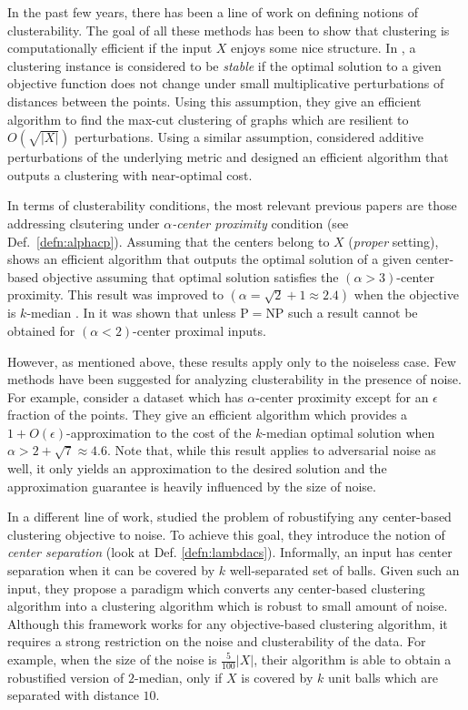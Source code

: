 \documentclass[12pt]{article}
\begin{document}
In the past few years, there has been a line of work on defining notions of clusterability. The goal of all these methods has been to show that clustering is computationally efficient if the input $X$ enjoys some nice structure. In \cite{bilu2012stable}, a clustering instance is considered to be \emph{stable} if the optimal solution to a given objective function does not change under small multiplicative perturbations of distances between the points. Using this assumption, they give an efficient algorithm to find the max-cut clustering of graphs which are resilient to $O(\sqrt{|X|})$ perturbations. Using a similar assumption, \cite{ackerman2009clusterability} considered additive perturbations of the underlying metric and designed an efficient algorithm that outputs a clustering with near-optimal cost. 

In terms of clusterability conditions, the most relevant previous papers are those addressing clsutering under {\em $\alpha$-center proximity} condition (see Def.~\ref{defn:alphacp}).
Assuming that the centers belong to $X$ ({\em proper} setting),  \cite{awasthi2012center} shows an efficient algorithm that outputs the optimal solution of a given center-based objective assuming that optimal solution satisfies the $(\alpha > 3)$-center proximity. This result was improved to $(\alpha = \sqrt{2} + 1 \approx 2.4)$ when the objective is $k$-median \cite{balcan2012clustering}. In \cite{ben2014data} it was shown that unless P$=$NP such a result cannot be obtained for $(\alpha <2)$-center proximal inputs.

However, as mentioned above, these results apply only to the noiseless case. Few methods have been suggested for analyzing clusterability in the presence of noise. For example, \cite{balcan2012clustering} consider a dataset which has $\alpha$-center proximity except for an $\epsilon$ fraction of the points. They give an efficient algorithm which provides a $1+O(\epsilon)$-approximation to the cost of the $k$-median optimal solution when $\alpha > 2+\sqrt{7} \approx 4.6$. Note that, while this result applies to adversarial noise as well, it only yields an approximation to the desired solution and  the approximation guarantee is heavily influenced by the size of noise. 

In a different line of work, \cite{ben2014clustering} studied the problem of robustifying any center-based clustering objective to noise. To achieve this goal, they introduce the notion of {\em center separation} (look at Def. \ref{defn:lambdacs}). Informally, an input has center separation when it can be covered by $k$ well-separated set of balls.
Given such an input, they propose a paradigm which converts any center-based clustering algorithm into a clustering algorithm which is robust to small amount of noise.
Although this framework works for any objective-based clustering algorithm, it requires a strong restriction on the noise and clusterability of the data. For example, when the size of the noise is $\frac{5}{100}|X|$, their algorithm is able to obtain a robustified version of $2$-median, only if $X$ is covered by $k$ unit balls which are separated with distance $10$. 
\end{document}
